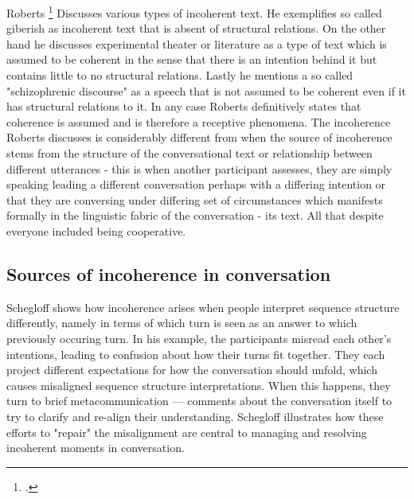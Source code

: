 \documentclass[12pt]{report}
\begin{document}
{Roberts \footcite{Roberts01101993} Discusses various types of incoherent text.
He exemplifies so called giberish as incoherent text that is absent of structural relations.
On the other hand he discusses experimental theater or literature as a type of text
which is assumed to be coherent in the sense that there is an intention behind it
but contains little to no structural relations.
Lastly he mentions a so called "schizophrenic discourse" as a speech that
is not assumed to be coherent even if it has structural relations to it.
In any case Roberts definitively states that coherence is assumed
and is therefore a receptive phenomena.
The incoherence Roberts discusses is considerably different from when
the source of incoherence stems from
    the structure of the conversational text or
    relationship between different utterances
    - this is when another participant assesses,
        they are simply speaking leading a different conversation
        perhaps with a differing intention
        or that they are conversing under differing set of circumstances
        which manifests formally in the linguistic fabric of the conversation - its text.
        All that despite everyone included being cooperative.

\subsection{Sources of incoherence in conversation}
\par
Schegloff shows how incoherence arises when
people interpret sequence structure differently,
namely in terms of which turn is seen as an answer to which previously occuring turn.
In his example, the participants misread each other’s intentions,
leading to confusion about how their turns fit together.
They each project different expectations for how the conversation should unfold,
which causes misaligned sequence structure interpretations.
When this happens,
they turn to brief metacommunication — comments about the conversation itself
to try to clarify and re-align their understanding.
Schegloff illustrates how these
efforts to "repair" the misalignment are central to
managing and resolving incoherent moments in conversation.

}
\end{document}
